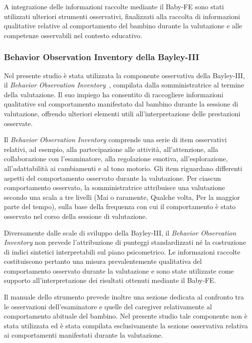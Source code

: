 A integrazione delle informazioni raccolte mediante il Baby-FE sono stati utilizzati ulteriori strumenti osservativi, finalizzati alla raccolta di informazioni qualitative relative al comportamento del bambino durante la valutazione e alle competenze osservabili nel contesto educativo.

 \subsubsection{Behavior Observation Inventory della Bayley-III}
 \label{sec:4_2_3_3}

Nel presente studio è stata utilizzata la componente osservativa della Bayley-III, il \emph{Behavior Observation Inventory}~\cite{bayley2006}, compilata dalla somministratrice al termine della valutazione. Il suo impiego ha consentito di raccogliere informazioni qualitative sul comportamento manifestato dal bambino durante la sessione di valutazione, offrendo ulteriori elementi utili all'interpretazione delle prestazioni osservate.

Il \emph{Behavior Observation Inventory} comprende una serie di item osservativi relativi, ad esempio, alla partecipazione alle attività, all'attenzione, alla collaborazione con l'esaminatore, alla regolazione emotiva, all'esplorazione, all'adattabilità ai cambiamenti e al tono motorio. Gli item riguardano differenti aspetti del comportamento osservato durante la valutazione. Per ciascun comportamento osservato, la somministratrice attribuisce una valutazione secondo una scala a tre livelli (Mai o raramente, Qualche volta, Per la maggior parte del tempo), sulla base della frequenza con cui il comportamento è stato osservato nel corso della sessione di valutazione.

Diversamente dalle scale di sviluppo della Bayley-III, il \emph{Behavior Observation Inventory} non prevede l'attribuzione di punteggi standardizzati né la costruzione di indici sintetici interpretabili sul piano psicometrico. Le informazioni raccolte costituiscono pertanto una misura prevalentemente qualitativa del comportamento osservato durante la valutazione e sono state utilizzate come supporto all'interpretazione dei risultati ottenuti mediante il Baby-FE.

Il manuale dello strumento prevede inoltre una sezione dedicata al confronto tra le osservazioni dell'esaminatore e quelle del caregiver relativamente al comportamento abituale del bambino. Nel presente studio tale componente non è stata utilizzata ed è stata compilata esclusivamente la sezione osservativa relativa ai comportamenti manifestati durante la valutazione.

